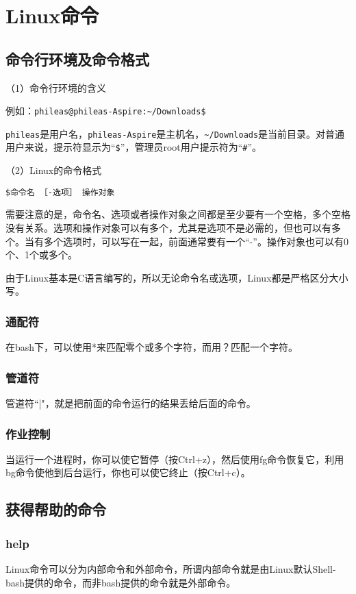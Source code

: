 \chapter{Linux命令}
\section{命令行环境及命令格式}
（1）命令行环境的含义

例如：\verb*|phileas@phileas-Aspire:~/Downloads$|

\verb|phileas|是用户名，\verb|phileas-Aspire|是主机名，\verb|~/Downloads|是当前目录。对普通用户来说，提示符显示为“\verb|$|”，管理员root用户提示符为“\verb|#|”。


（2）Linux的命令格式

\verb*|$命令名 ［-选项］ 操作对象|

需要注意的是，命令名、选项或者操作对象之间都是至少要有一个空格，多个空格没有关系。选项和操作对象可以有多个，尤其是选项不是必需的，但也可以有多个。当有多个选项时，可以写在一起，前面通常要有一个“-”。操作对象也可以有0个、1个或多个。

由于Linux基本是C语言编写的，所以无论命令名或选项，Linux都是严格区分大小写。

\subsection{通配符}
在bash下，可以使用*来匹配零个或多个字符，而用？匹配一个字符。



\subsection{管道符}
管道符``|"，就是把前面的命令运行的结果丢给后面的命令。


\subsection{作业控制}
当运行一个进程时，你可以使它暂停（按Ctrl+z），然后使用fg命令恢复它，利用bg命令使他到后台运行，你也可以使它终止（按Ctrl+c）。







\section{获得帮助的命令}
\subsection{help}
Linux命令可以分为内部命令和外部命令，所谓内部命令就是由Linux默认Shell-bash提供的命令，而非bash提供的命令就是外部命令。


